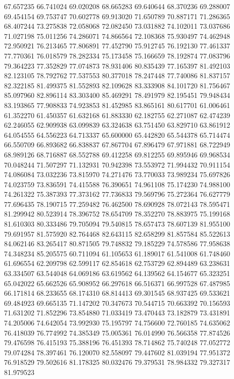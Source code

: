 67.657235
66.741024
69.020208
68.665283
69.640644
68.370236
69.288007
69.454154
69.753747
70.602778
69.913020
71.650789
70.887171
71.286365
68.407244
73.275838
72.058068
72.082450
73.031882
74.102011
73.037686
71.027198
75.011256
74.286071
74.866564
72.108368
75.930497
74.462948
72.950921
76.213465
77.806891
77.452790
75.912745
76.192130
77.461337
77.770361
76.018579
78.282334
75.173458
75.166659
78.192874
77.083796
79.364223
77.352829
77.074873
78.931406
80.835439
77.165397
81.492103
82.123105
78.792762
77.537553
80.377018
78.247448
77.740086
81.837157
82.322185
81.499375
81.552893
82.109628
83.333908
84.101720
81.756467
85.097960
82.896114
83.303400
85.469291
78.491979
82.195451
79.948434
83.193865
77.908833
74.923853
81.452985
83.865161
80.617701
61.006461
61.352270
61.450357
61.632168
61.883330
62.182755
62.271087
62.474239
62.246055
62.909938
63.099839
63.324638
63.751450
63.829710
63.861912
64.054555
64.556223
64.713337
65.600000
65.442820
65.544378
65.714474
66.550709
66.893682
66.838837
67.867704
67.896479
67.971881
68.722949
68.989126
68.716887
68.552788
69.412258
69.812255
69.895946
69.968534
70.048244
71.507297
71.132931
70.942398
73.553972
71.994432
70.911154
74.086084
73.032236
73.815970
74.271476
73.770033
73.989234
75.697826
74.023759
73.836591
74.415588
76.390651
74.961108
75.174230
74.988100
74.261322
75.387393
77.373162
77.736833
79.569796
75.272364
76.627779
77.696435
78.190715
77.259482
76.462500
78.690928
78.072143
78.595471
81.299942
80.523914
78.396752
78.654709
78.352270
78.883975
75.199168
81.610303
80.333486
79.705094
79.540815
78.657473
78.607139
81.955100
79.691957
81.575920
82.764468
82.643115
82.658299
81.857584
85.522613
84.062146
83.265417
80.871505
79.748832
79.185229
74.578586
77.958638
74.348234
85.205575
60.711094
61.105653
61.189017
61.541008
61.748460
61.696554
62.209798
62.599117
62.854618
62.753729
62.894489
63.238631
63.334507
63.544048
64.069186
63.619562
64.139562
64.154677
65.323251
65.042022
65.662526
65.908952
66.297618
66.516371
66.997528
67.487985
66.171814
68.233655
68.174310
68.814413
69.301545
68.937425
69.533621
69.484923
69.665135
71.147202
70.347673
70.544715
70.663392
70.156593
71.631202
71.852296
73.854880
71.033419
73.470443
73.182879
73.431891
74.205006
74.642054
73.992930
75.195797
74.756600
72.760185
74.635062
76.418039
76.774992
74.385349
75.005361
76.014990
76.566358
77.874526
79.476598
76.415193
75.388196
76.451393
78.714862
75.740248
77.052772
79.074284
78.397461
76.120070
82.558097
79.447602
81.039194
77.951372
76.918529
79.502616
81.178325
80.032476
79.379531
78.984332
79.327317
81.979523
